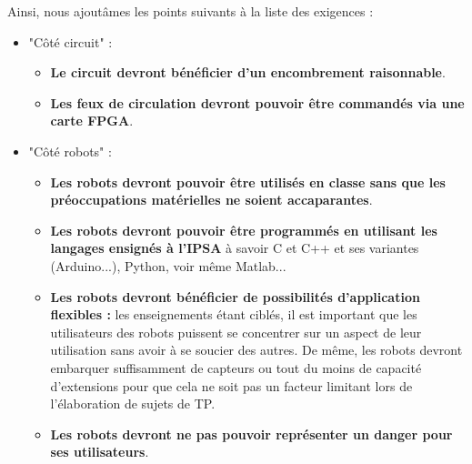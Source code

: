 Ainsi, nous ajoutâmes les points suivants à la liste des exigences :
\begin{itemize}
	\item "Côté circuit" :
	\begin{itemize}
		\item \textbf{Le circuit devront bénéficier d'un encombrement raisonnable}.
		\item \textbf{Les feux de circulation devront pouvoir être commandés via une carte FPGA}.
	\end{itemize}
	\item "Côté robots" :
	\begin{itemize}
		\item \textbf{Les robots devront pouvoir être utilisés en classe sans que les préoccupations matérielles ne soient accaparantes}.
		\item \textbf{Les robots devront pouvoir être programmés en utilisant les langages ensignés à l'IPSA} à savoir C et C++ et ses variantes (Arduino...), Python, voir même Matlab...
		\item \textbf{Les robots devront bénéficier de possibilités d'application flexibles :} les enseignements étant ciblés, il est important que les utilisateurs des robots puissent se concentrer sur un aspect de leur utilisation sans avoir à se soucier des autres. De même, les robots devront embarquer suffisamment de capteurs ou tout du moins de capacité d'extensions pour que cela ne soit pas un facteur limitant lors de l'élaboration de sujets de TP.
		\item \textbf{Les robots devront ne pas pouvoir représenter un danger pour ses utilisateurs}.
	\end{itemize}
\end{itemize}